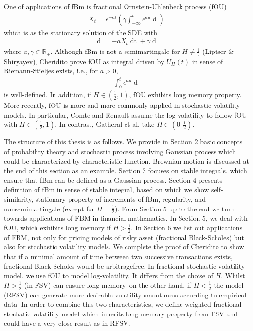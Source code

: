 \documentclass[a4paper, twoside, 11pt]{article}
\theoremstyle{definition}
\newcommand{\brkt}[1]{\left({#1} \right)}
\begin{document}
One of applications of fBm is fractional Ornstein-Uhlenbeck process (fOU) 
\begin{eqnarray*}
  X_t = e^{-at}\brkt{\gamma\int_{-\infty}^t e^{au}\mathop{dU_H(u)}}
\end{eqnarray*}
which is as the stationary solution of the SDE with 
\begin{eqnarray*}
  \mathop{dX_t} = -aX_t\mathop{dt} + \gamma\mathop{dU_H(t)}
\end{eqnarray*}
where $a,\gamma \in \mathbb{R}_+$. Although fBm is not a semimartingale for $H\neq \frac{1}{2}$ (Liptser \& Shiryayev\cite{liptshir}), Cheridito prove fOU as integral driven by $U_H(t)$ in sense of Riemann-Stieljes exists, i.e., for $a>0$,
\begin{eqnarray*}
  \int_{0}^t e^{au}\mathop{dU_H(u)}
\end{eqnarray*}
is well-defined. In addition, if $H\in(\frac{1}{2}, 1)$, fOU exhibits long memory property. More recently, fOU is more and more commonly applied in stochastic volatility models. In particular, Comte and Renault\cite{comren} assume the log-volatility to follow fOU with $H\in(\frac{1}{2}, 1)$. In contrast, Gatheral et al.\cite{Gatheral} take $H \in (0, \frac{1}{2})$.

The structure of this thesis is as follows. We provide in Section 2 basic concepts of probability theory and stochastic process involving Gaussian process which could be characterized by characteristic function. Brownian motion is discussed at the end of this section as an example. Section 3 focuses on stable integrals, which ensure that fBm can be defined as a Gaussian process. Section 4 presents definition of fBm in sense of stable integral, based on which we show self-similarity, stationary property of increments of fBm, regularity, and nonsemimartingale (except for $H=\frac{1}{2}$). From Section 5 up to the end we turn towards applications of FBM in financial mathematics. In Section 5, we deal with fOU, which exhibits long memory if $H > \frac{1}{2}$. In Section 6 we list out applications of FBM, not only for pricing models of risky asset (fractional Black-Scholes)  but also for stochastic volatility models. We complete the proof of Cheridito to show that if a minimal amount of time between two successive transactions exists, fractional Black-Scholes would be arbitragefree. In fractional stochastic volatility model, we use fOU to model log-volatility. It differs from the choise of $H$. Whilst $H>\frac{1}{2}$ (in FSV) can ensure long memory, on the other hand, if $H < \frac{1}{2}$ the model (RFSV) can generate more desirable volatility smoothness according to empirical data. In order to combine this two characteristics, we define weighted fractional stochatic volatility model which inherits long memory property from FSV and could have a very close result as in RFSV.
\end{document}
